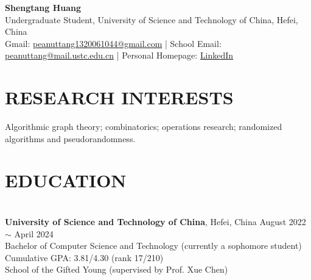 \documentclass[a4paper,9pt]{extarticle}
\begin{document}
\pagestyle{fancy}
\renewcommand{\headrulewidth}{0pt}
\fancyhead{}
\fancyhead[R]{\textit{\today}}
\thispagestyle{empty} %

\begin{flushleft}
\textbf{\LARGE Shengtang Huang}\\[2pt] %
Undergraduate Student, University of Science and Technology of China, Hefei, China
\\ Gmail: \href{mailto:peanuttang1320061044@gmail.com}{peanuttang1320061044@gmail.com} | School Email: \href{mailto:peanuttang@mail.ustc.edu.cn}{peanuttang@mail.ustc.edu.cn} | Personal Homepage: \href{https://shengtanghuang.netlify.app/about/}{LinkedIn} %
\end{flushleft}

\section*{RESEARCH INTERESTS}
\noindent
Algorithmic graph theory; combinatorics; operations research; randomized algorithms and pseudorandomness.
\section*{EDUCATION}

\noindent\\
\textbf{University of Science and Technology of China},  Hefei, China \hfill August 2022 $\sim$ April 2024\\ %
Bachelor of Computer Science and Technology (currently a sophomore student) \hfill Cumulative GPA: 3.81/4.30 (rank 17/210) \\
School of the Gifted Young (supervised by Prof. Xue Chen)

\end{document}
